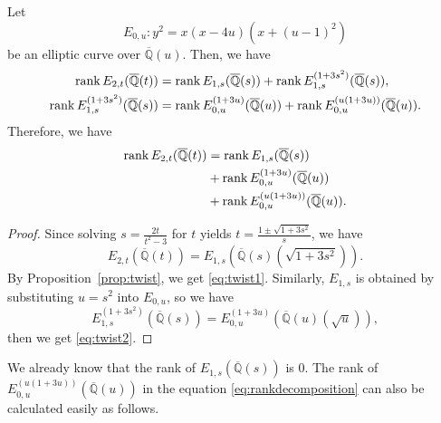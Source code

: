 \documentclass[main]{subfiles}
\begin{document}
\begin{thm}
    Let
    \begin{equation*}
        E_{0,u}: y^{2} = x(x - 4u)(x + (u - 1)^{2})
    \end{equation*}
    be an elliptic curve over $\overline{\mathbb{Q}}(u)$.
    Then, we have
    \begin{align}
        \operatorname{rank} E_{2,t}(\overline{\mathbb{Q}}(t))                & = \operatorname{rank} E_{1,s}(\overline{\mathbb{Q}}(s)) + \operatorname{rank} E_{1,s}^{(1 + 3s^{2})}(\overline{\mathbb{Q}}(s)), \label{eq:twist1}           \\
        \operatorname{rank} E_{1,s}^{(1 + 3s^{2})}(\overline{\mathbb{Q}}(s)) & = \operatorname{rank} E_{0,u}^{(1 + 3u)}(\overline{\mathbb{Q}}(u)) + \operatorname{rank} E_{0,u}^{(u(1 + 3u))}(\overline{\mathbb{Q}}(u)). \label{eq:twist2}
    \end{align}
    Therefore, we have
    \begin{equation}
        \label{eq:rankdecomposition}
        \begin{split}
            \operatorname{rank} E_{2,t}(\overline{\mathbb{Q}}(t)) & = \operatorname{rank} E_{1,s}(\overline{\mathbb{Q}}(s))                \\
                                                    & + \operatorname{rank} E_{0,u}^{(1 + 3u)}(\overline{\mathbb{Q}}(u))     \\
                                                    & + \operatorname{rank} E_{0,u}^{(u(1 + 3u))}(\overline{\mathbb{Q}}(u)).
        \end{split}
    \end{equation}
\end{thm}
\begin{proof}
    Since solving $s = \frac{2t}{t^{2} - 3}$ for $t$ yields $t = \frac{1 \pm \sqrt{1 + 3s^{2}}}{s}$, we have
    \begin{equation*}
        E_{2,t}(\overline{\mathbb{Q}}(t)) = E_{1,s}(\overline{\mathbb{Q}}(s)(\sqrt{1 + 3s^{2}})).
    \end{equation*}
    By Proposition~\ref{prop:twist}, we get \eqref{eq:twist1}.
    Similarly, $E_{1,s}$ is obtained by substituting $u = s^{2}$ into $E_{0,u}$, so we have
    \begin{equation*}
        E_{1,s}^{(1 + 3s^{2})}(\overline{\mathbb{Q}}(s)) = E_{0,u}^{(1 + 3u)}(\overline{\mathbb{Q}}(u)(\sqrt{u})),
    \end{equation*}
    then we get \eqref{eq:twist2}.
\end{proof}

We already know that the rank of $E_{1,s}(\overline{\mathbb{Q}}(s))$ is $0$.
The rank of $E_{0,u}^{(u(1 + 3u))}(\overline{\mathbb{Q}}(u))$ in the equation \eqref{eq:rankdecomposition} can also be calculated easily as follows.
\end{document}
